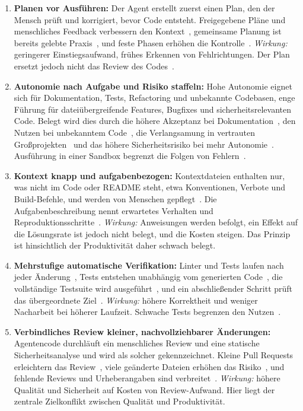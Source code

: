 \begin{enumerate}
\item[\textbf{P1}] \textbf{Planen vor Ausführen:} Der Agent erstellt zuerst einen Plan, den der Mensch prüft und korrigiert, bevor Code entsteht. Freigegebene Pläne und menschliches Feedback verbessern den Kontext~\cite{takerngsaksiri2025hula}, gemeinsame Planung ist bereits gelebte Praxis~\cite{dhanorkar2026oversight}, und feste Phasen erhöhen die Kontrolle~\cite{xia2025agentless}. \textit{Wirkung:} geringerer Einstiegsaufwand, frühes Erkennen von Fehlrichtungen. Der Plan ersetzt jedoch nicht das Review des Codes~\cite{dhanorkar2026oversight}.

\item[\textbf{P2}] \textbf{Autonomie nach Aufgabe und Risiko staffeln:} Hohe Autonomie eignet sich für Dokumentation, Tests, Refactoring und unbekannte Codebasen, enge Führung für dateiübergreifende Features, Bugfixes und sicherheitsrelevanten Code. Belegt wird dies durch die höhere Akzeptanz bei Dokumentation~\cite{li2025aidev}, den Nutzen bei unbekanntem Code~\cite{chen2025codewithme}, die Verlangsamung in vertrauten Großprojekten~\cite{becker2025metr} und das höhere Sicherheitsrisiko bei mehr Autonomie~\cite{sajadi2025patchsecurity}. Ausführung in einer Sandbox begrenzt die Folgen von Fehlern~\cite{wang2025openhands}.

\item[\textbf{P3}] \textbf{Kontext knapp und aufgabenbezogen:} Kontextdateien enthalten nur, was nicht im Code oder README steht, etwa Konventionen, Verbote und Build-Befehle, und werden von Menschen gepflegt~\cite{gloaguen2026agentsmd,mohsenimofidi2026context}. Die Aufgabenbeschreibung nennt erwartetes Verhalten und Reproduktionsschritte~\cite{takerngsaksiri2025hula,sajadi2025patchsecurity}. \textit{Wirkung:} Anweisungen werden befolgt, ein Effekt auf die Lösungsrate ist jedoch nicht belegt, und die Kosten steigen. Das Prinzip ist hinsichtlich der Produktivität daher schwach belegt.

\item[\textbf{P4}] \textbf{Mehrstufige automatische Verifikation:} Linter und Tests laufen nach jeder Änderung~\cite{yang2024sweagent}, Tests entstehen unabhängig vom generierten Code~\cite{huang2023agentcoder}, die vollständige Testsuite wird ausgeführt~\cite{wang2026solvedissues}, und ein abschließender Schritt prüft das übergeordnete Ziel~\cite{cemri2025mast}. \textit{Wirkung:} höhere Korrektheit und weniger Nacharbeit bei höherer Laufzeit. Schwache Tests begrenzen den Nutzen~\cite{aleithan2024swebenchplus}.

\item[\textbf{P5}] \textbf{Verbindliches Review kleiner, nachvollziehbarer Änderungen:} Agentencode durchläuft ein menschliches Review und eine statische Sicherheitsanalyse und wird als solcher gekennzeichnet. Kleine Pull Requests erleichtern das Review~\cite{watanabe2025agenticprs}, viele geänderte Dateien erhöhen das Risiko~\cite{sajadi2025patchsecurity}, und fehlende Reviews und Urheberangaben sind verbreitet~\cite{li2025aidev}. \textit{Wirkung:} höhere Qualität und Sicherheit auf Kosten von Review-Aufwand. Hier liegt der zentrale Zielkonflikt zwischen Qualität und Produktivität.
\end{enumerate}
